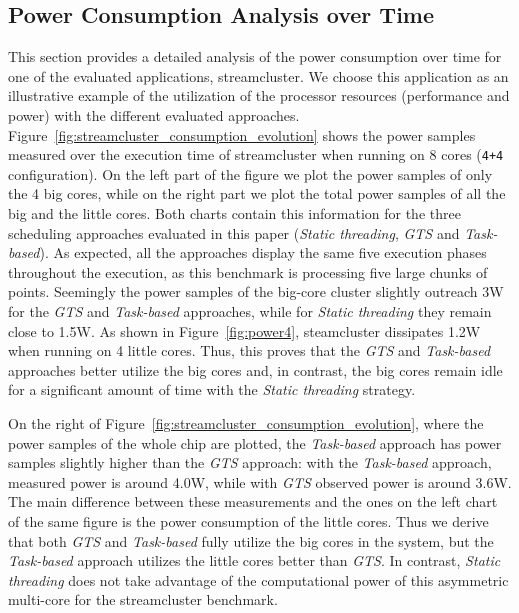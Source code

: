 \subsection{Power Consumption Analysis over Time}


This section provides a detailed analysis of the power consumption over time for one of the evaluated applications, streamcluster.
We choose this application as an illustrative example of the utilization of the processor resources 
(performance and power) with the different evaluated approaches.
Figure~\ref{fig:streamcluster_consumption_evolution} shows the power samples measured over the 
execution time of streamcluster when running on 8 cores (\texttt{4+4} configuration).
On the left part of the figure we plot the power samples of only the 4 big cores, while on the right part we plot the total power samples of all the big and the little cores.
Both charts contain this information for the three scheduling approaches evaluated in this paper (\emph{Static threading}, \emph{GTS} and \emph{Task-based}).
As expected, all the approaches display the same five execution phases throughout the execution, as this benchmark is processing five large chunks of points.
Seemingly the power samples of the big-core cluster slightly outreach 3W for the \emph{GTS} and \emph{Task-based} approaches, while for \emph{Static threading} they remain close to 1.5W. As shown in Figure~\ref{fig:power4}, steamcluster dissipates 1.2W when running on 4 little cores.
Thus, this proves that the \emph{GTS} and \emph{Task-based} approaches better utilize the big cores and, in contrast, the big cores remain idle for a significant amount of time with the \emph{Static threading} strategy.

On the right of Figure~\ref{fig:streamcluster_consumption_evolution}, where the power samples of the whole chip are plotted, the \emph{Task-based} approach has power samples slightly higher than the \emph{GTS} approach:
with the \emph{Task-based} approach, measured power is around 4.0W, while with \emph{GTS} observed power is around 3.6W.
The main difference between these measurements and the ones on the left chart of the same figure is the power consumption of the little cores. 
Thus we derive that both \emph{GTS} and \emph{Task-based} fully utilize the big cores in the system, but the \emph{Task-based} approach utilizes the little cores better than \emph{GTS}. In contrast, \emph{Static threading} does not take advantage of the computational power of this asymmetric multi-core for the streamcluster benchmark.


